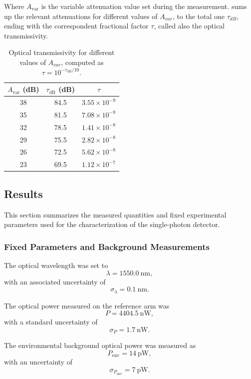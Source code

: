 Where $A_{\text{var}}$ is the variable attenuation value set during
the measurement.  sums up the relevant
attenuations for different values of $A_{var}$, to the total one
$\tau_{dB}$, ending with the
correspondent fractional factor $\tau$, called also the optical transmissivity.

\begin{table}[h]
  \centering
  \begin{tabular}{ccc}
    \toprule
    {\bfseries\boldmath $A_{\mathrm{var}}$ (dB)} &
    {\bfseries\boldmath $\tau_{\mathrm{dB}}$ (dB)} &
    {\bfseries\boldmath $\tau$} \\
    \midrule
    38 & 84.5 & $3.55\times 10^{-9}$ \\
    35 & 81.5 & $7.08\times 10^{-9}$ \\
    32 & 78.5 & $1.41\times 10^{-8}$ \\
    29 & 75.5 & $2.82\times 10^{-8}$ \\
    26 & 72.5 & $5.62\times 10^{-8}$ \\
    23 & 69.5 & $1.12\times 10^{-7}$ \\
    \bottomrule
  \end{tabular}
  \caption{Optical transmissivity for different values of $A_{var}$,
  computed as $\tau = 10^{-\tau_{\mathrm{dB}}/10}$.}
  \label{tab:tau_values}
\end{table}

\subsection{Results}

This section summarizes the measured quantities and fixed
experimental parameters used for the characterization of the
single-photon detector.

\subsubsection*{Fixed Parameters and Background Measurements}

The optical wavelength was set to
\[
  \lambda = 1550.0~\text{nm},
\]
with an associated uncertainty of
\[
  \sigma_{\lambda} = 0.1~\text{nm}.
\]

The optical power measured on the reference arm was
\[
  P = 4404.5 ~\text{nW},
\]
with a standard uncertainty of
\[
  \sigma_{P} = 1.7 ~\text{nW}.
\]

The environmental background optical power was measured as
\[
  P_{\mathrm{env}} = 14~\text{pW},
\]
with an uncertainty of
\[
  \sigma_{P_{\mathrm{env}}} = 7 ~\text{pW}.
\]

